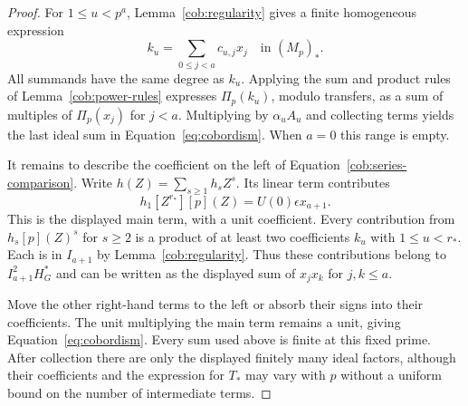 \begin{proof}
 For $1\leq u<p^a$, Lemma~\ref{cob:regularity} gives a finite
 homogeneous expression
 \[
  k_u=\sum_{0\leq j<a}c_{u,j}x_j
       \quad\text{in }(M_p)_*.
 \]
 All summands have the same degree as $k_u$.  Applying the sum
 and product rules of Lemma~\ref{cob:power-rules} expresses
 $\Pi_p(k_u)$, modulo transfers, as a sum of multiples of
 $\Pi_p(x_j)$ for $j<a$.  Multiplying by $\alpha_uA_u$ and
 collecting terms yields the last ideal sum in
 Equation~\eqref{eq:cobordism}.  When $a=0$ this range is empty.

 It remains to describe the coefficient on the left of
 Equation~\eqref{cob:series-comparison}.  Write
 $h(Z)=\sum_{s\geq 1}h_sZ^s$.  Its linear term contributes
 \[
  h_1[Z^{r_*}][p](Z)
      =U(0)\epsilon x_{a+1}.
 \]
 This is the displayed main term, with a unit coefficient.
 Every contribution from $h_s[p](Z)^s$ for $s\geq 2$ is a
 product of at least two coefficients $k_u$ with
 $1\leq u<r_*$.  Each is in $I_{a+1}$ by
 Lemma~\ref{cob:regularity}.  Thus these contributions belong to
 $I_{a+1}^2H_G^*$ and can be written as the displayed sum of
 $x_jx_k$ for $j,k\leq a$.

 Move the other right-hand terms to the left or absorb their signs
 into their coefficients.  The unit multiplying the main term
 remains a unit, giving Equation~\eqref{eq:cobordism}.  Every sum
 used above is finite at this fixed prime.  After collection there
 are only the displayed finitely many ideal factors, although
 their coefficients and the expression for $T_*$ may vary with
 $p$ without a uniform bound on the number of intermediate terms.
\end{proof}
